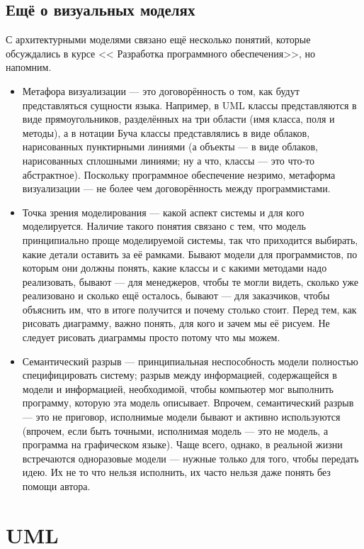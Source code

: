 \documentclass[a5paper]{article}
\begin{document}
\subsection{Ещё о визуальных моделях}

С архитектурными моделями связано ещё несколько понятий, которые обсуждались в курсе << Разработка программного обеспечения>>, но напомним.

\begin{itemize}
	\item Метафора визуализации --- это договорённость о том, как будут представляться сущности языка. Например, в UML классы представляются в виде прямоугольников, разделённых на три области (имя класса, поля и методы), а в нотации Буча классы представлялись в виде облаков, нарисованных пунктирными линиями (а объекты --- в виде облаков, нарисованных сплошными линиями; ну а что, классы --- это что-то абстрактное). Поскольку программное обеспечение незримо, метаформа визуализации --- не более чем договорённость между программистами.
	\item Точка зрения моделирования --- какой аспект системы и для кого моделируется. Наличие такого понятия связано с тем, что модель принципиально проще моделируемой системы, так что приходится выбирать, какие детали оставить за её рамками. Бывают модели для программистов, по которым они должны понять, какие классы и с какими методами надо реализовать, бывают --- для менеджеров, чтобы те могли видеть, сколько уже реализовано и сколько ещё осталось, бывают --- для заказчиков, чтобы объяснить им, что в итоге получится и почему столько стоит. Перед тем, как рисовать диаграмму, важно понять, для кого и зачем мы её рисуем. Не следует рисовать диаграммы просто потому что мы можем.
	\item Семантический разрыв --- принципиальная неспособность модели полностью специфицировать систему; разрыв между информацией, содержащейся в модели и информацией, необходимой, чтобы компьютер мог выполнить программу, которую эта модель описывает. Впрочем, семантический разрыв --- это не приговор, исполнимые модели бывают и активно используются (впрочем, если быть точными, исполнимая модель --- это не модель, а программа на графическом языке). Чаще всего, однако, в реальной жизни встречаются одноразовые модели --- нужные только для того, чтобы передать идею. Их не то что нельзя исполнить, их часто нельзя даже понять без помощи автора.
\end{itemize}

\section{UML}
\end{document}

